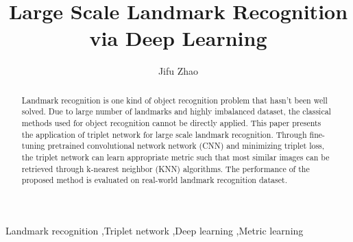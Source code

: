 \documentclass[final,3p]{elsarticle}
\date{}
\begin{document}
\begin{frontmatter}


\title{Large Scale Landmark Recognition via Deep Learning}




\author{Jifu Zhao}

\address{Department of Nuclear, Plasma, and Radiological Engineering \\
University of Illinois at Urbana-Champaign, Urbana, Illinois 61801, USA}


\begin{abstract}
Landmark recognition is one kind of object recognition problem that hasn't been well solved. Due to large number of landmarks and highly imbalanced dataset, the classical methods used for object recognition cannot be directly applied. This paper presents the application of triplet network for large scale landmark recognition. Through fine-tuning pretrained convolutional network network (CNN) and minimizing triplet loss, the triplet network can learn appropriate metric such that most similar images can be retrieved through k-nearest neighbor (KNN) algorithms. The performance of the proposed method is evaluated on real-world landmark recognition dataset.
\end{abstract}

\begin{keyword}
Landmark recognition \sep Triplet network \sep Deep learning \sep Metric learning
\end{keyword}

\end{frontmatter}
\end{document}

